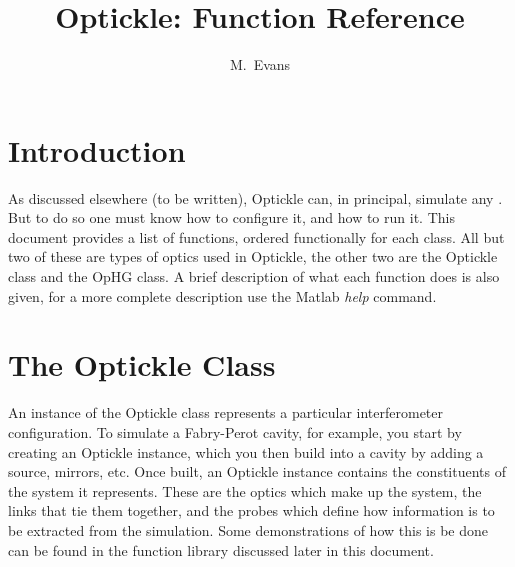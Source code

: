 \documentclass[12pt]{article}
\title{Optickle: Function Reference}
\author{M.~Evans}
\begin{document}
\maketitle


\section{Introduction}

As discussed elsewhere (to be written), Optickle can, in principal, simulate any \ifo.
But to do so one must know how to configure it, and how to run it.
This document provides a list of functions, ordered functionally for each class.
All but two of these are types of optics used in Optickle, the other two are the Optickle class and the OpHG class.
A brief description of what each function does is also given, for a more complete description
use the Matlab {\it help} command.

\section{The Optickle Class}

An instance of the Optickle class represents a particular interferometer configuration.
To simulate a Fabry-Perot cavity, for example, you start by creating an Optickle instance,
which you then build into a cavity by adding a source, mirrors, etc.
Once built, an Optickle instance contains the constituents of the system it represents.
These are the optics which make up the system, the links that tie them together, and the probes which define how information is to be extracted from the simulation.
Some demonstrations of how this is be done can be found in the function library discussed later in this document.
\end{document}
